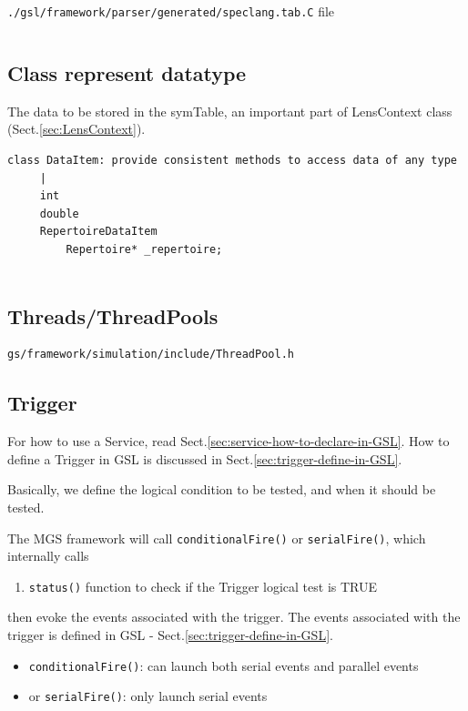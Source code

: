 \verb!./gsl/framework/parser/generated/speclang.tab.C! file

\begin{lstlisting}

\end{lstlisting}

\subsection{Class represent datatype}

The data to be stored in the symTable, an important part of LensContext class
(Sect.\ref{sec:LensContext}).

\begin{verbatim}
class DataItem: provide consistent methods to access data of any type
     |
     int
     double
     RepertoireDataItem
         Repertoire* _repertoire;
     
\end{verbatim}


\subsection{Threads/ThreadPools}


\begin{verbatim}
gs/framework/simulation/include/ThreadPool.h
\end{verbatim}




\subsection{Trigger}
\label{sec:Trigger}

For how to use a Service, read Sect.\ref{sec:service-how-to-declare-in-GSL}. How
to define a Trigger in GSL is discussed in Sect.\ref{sec:trigger-define-in-GSL}.

Basically, we define the logical condition to be tested, and when it should be
tested.

The MGS framework will call \verb!conditionalFire()! or \verb!serialFire()!,
which internally calls
\begin{enumerate}
  \item \verb!status()! function to check if the Trigger logical test is TRUE  
\end{enumerate}
then evoke the events associated with the trigger. The events associated with
the trigger is defined in GSL - Sect.\ref{sec:trigger-define-in-GSL}.
\begin{itemize}
  \item  \verb!conditionalFire()!:  can launch both serial events and parallel
  events
  
  \item or \verb!serialFire()!: only launch serial events
\end{itemize}

